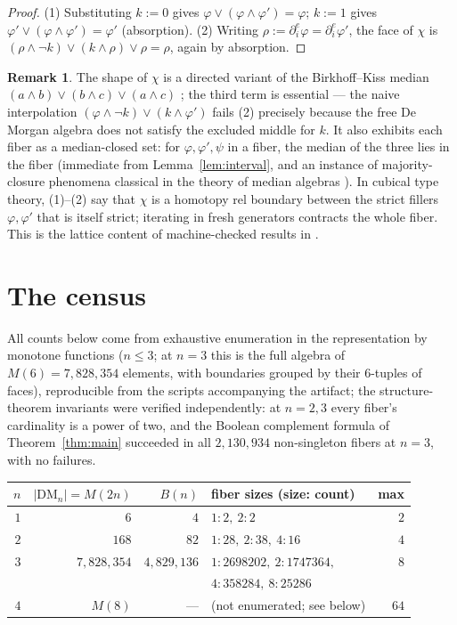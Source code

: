 \documentclass[11pt]{amsart}
\theoremstyle{definition}
\newtheorem{rem}[thm]{Remark}
\newcommand{\DM}{\mathrm{DM}}
\newcommand{\bnd}{\partial}
\begin{document}
\begin{proof}
  (1) Substituting $k := 0$ gives
  $\varphi \vee (\varphi \wedge \varphi') = \varphi$; $k := 1$ gives
  $\varphi' \vee (\varphi \wedge \varphi') = \varphi'$ (absorption).
  (2) Writing $\rho := \bnd_i^e\varphi = \bnd_i^e\varphi'$, the face
  of $\chi$ is
  $(\rho \wedge \neg k) \vee (k \wedge \rho) \vee \rho = \rho$,
  again by absorption.
\end{proof}

\begin{rem}
  The shape of $\chi$ is a directed variant of the Birkhoff--Kiss
  median $(a\wedge b)\vee(b\wedge c)\vee(a\wedge c)$
  \cite{BirkhoffKiss}; the third term is essential --- the naive
  interpolation $(\varphi \wedge \neg k) \vee (k \wedge \varphi')$
  fails (2) precisely because the free De Morgan algebra does not
  satisfy the excluded middle for $k$.  It also exhibits each fiber
  as a median-closed set: for $\varphi, \varphi', \psi$ in a fiber,
  the median of the three lies in the fiber (immediate from
  Lemma~\ref{lem:interval}, and an instance of majority-closure
  phenomena classical in the theory of median algebras
  \cite{BandeltHedlikova}).  In cubical type theory, (1)--(2) say
  that $\chi$ is a homotopy rel boundary between the strict fillers
  $\varphi, \varphi'$ that is itself strict; iterating in fresh
  generators contracts the whole fiber.  This is the lattice content
  of machine-checked results in \cite{Convexity}.
\end{rem}

\section{The census}
\label{sec:census}

All counts below come from exhaustive enumeration in the
representation by monotone functions ($n \le 3$; at $n = 3$ this is
the full algebra of $M(6) = 7{,}828{,}354$ elements, with boundaries
grouped by their $6$-tuples of faces), reproducible from the scripts
accompanying the artifact; the structure-theorem invariants were
verified independently: at $n = 2, 3$ every fiber's cardinality is a
power of two, and the Boolean complement formula of
Theorem~\ref{thm:main} succeeded in all $2{,}130{,}934$ non-singleton
fibers at $n = 3$, with no failures.

\begin{center}
\small
\begin{tabular}{r|r|r|l|r}
  $n$ & $|\DM_n| = M(2n)$ & $B(n)$ & fiber sizes (size: count) &
  max \\
  \hline
  $1$ & $6$ & $4$ & $1{:}2,\ 2{:}2$ & $2$\\
  $2$ & $168$ & $82$ & $1{:}28,\ 2{:}38,\ 4{:}16$ & $4$\\
  $3$ & $7{,}828{,}354$ & $4{,}829{,}136$ &
  $1{:}2698202,\ 2{:}1747364,$ & $8$\\
  & & & $4{:}358284,\ 8{:}25286$ & \\
  $4$ & $M(8)$ & --- & (not enumerated; see below) & $64$
\end{tabular}
\end{center}
\end{document}
